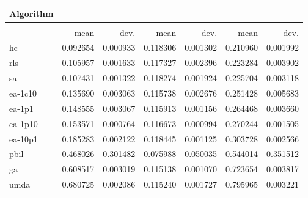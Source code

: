 \begin{tabular}{@{} l *{6}{>{{}}N{1}{2}} @{}}
\toprule
{Algorithm} &  \\
\midrule
&  &  &  \\
\midrule
& {mean} & {dev.} & {mean} & {dev.} & {mean} & {dev.} \\
\midrule
hc & 0.092654 & 0.000933 & 0.118306 & 0.001302 & 0.210960 & 0.001992 \\
rls & 0.105957 & 0.001633 & 0.117327 & 0.002396 & 0.223284 & 0.003902 \\
sa & 0.107431 & 0.001322 & 0.118274 & 0.001924 & 0.225704 & 0.003118 \\
ea-1c10 & 0.135690 & 0.003063 & 0.115738 & 0.002676 & 0.251428 & 0.005683 \\
ea-1p1 & 0.148555 & 0.003067 & 0.115913 & 0.001156 & 0.264468 & 0.003660 \\
ea-1p10 & 0.153571 & 0.000764 & 0.116673 & 0.000994 & 0.270244 & 0.001505 \\
ea-10p1 & 0.185283 & 0.002122 & 0.118445 & 0.001125 & 0.303728 & 0.002566 \\
pbil & 0.468026 & 0.301482 & 0.075988 & 0.050035 & 0.544014 & 0.351512 \\
ga & 0.608517 & 0.003019 & 0.115138 & 0.001070 & 0.723654 & 0.003817 \\
umda & 0.680725 & 0.002086 & 0.115240 & 0.001727 & 0.795965 & 0.003221 \\
\bottomrule
\end{tabular}
